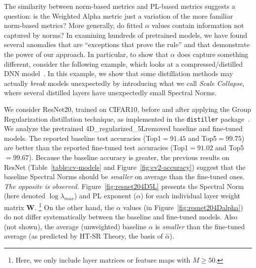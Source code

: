 The similarity between norm-based metrics and PL-based metrics suggests a question: is the Weighted Alpha metric just a variation of the more familiar norm-based metrics?  %
More generally, do fitted $\alpha$ values contain information not captured by norms? 
In examining hundreds of pretrained models, we have found several anomalies that are ``exceptions that prove the rule'' and that demonstrate the power of our approach.
In particular, to show that $\alpha$ does capture something different, consider the following example, which looks at a compressed/distilled DNN model~\cite{CWZZ17_TR}.
In this example, we show that some distillation methods may actually \emph{break} models unexpectedly by introducing what we call \emph{Scale Collapse}, where several distilled layers have unexpectedly small Spectral Norms.

We consider ResNet20, trained on CIFAR10, before and after applying the Group Regularization distillation technique, as implemented in the \texttt{distiller} package~\cite{distiller}.
We analyze the pretrained 4D\_regularized\_5Lremoved baseline and fine-tuned models. 
The reported baseline test accuracies (Top1$=91.45$ and Top5$=99.75$) are better than the reported fine-tuned test accuracies (Top1$=91.02$ and Top5$=99.67$).  Because the baseline accuracy is greater,  the previous results on ResNet (Table~\ref{table:cv-models} and Figure~\ref{fig:cv2-accuracy}) suggest that the baseline Spectral Norms should be \emph{smaller} on average than the fine-tuned ones. \emph{The opposite is observed.}
Figure~\ref{fig:resnet204D5L} presents the Spectral Norm (here denoted $\log\lambda_{max}$) and PL exponent ($\alpha$) for each individual layer weight matrix $\mathbf{W}$.%
\footnote{Here, we only include layer matrices or feature maps with $M\ge50$.}
On the other hand, the $\alpha$ values (in Figure~\ref{fig:resnet204Dalpha}) do not differ systematically between the baseline and fine-tuned models.
Also (not shown), the average (unweighted) baseline $\alpha$ is \emph{smaller} than the fine-tuned average (as predicted by HT-SR Theory, the basis of $\hat{\alpha}$).

